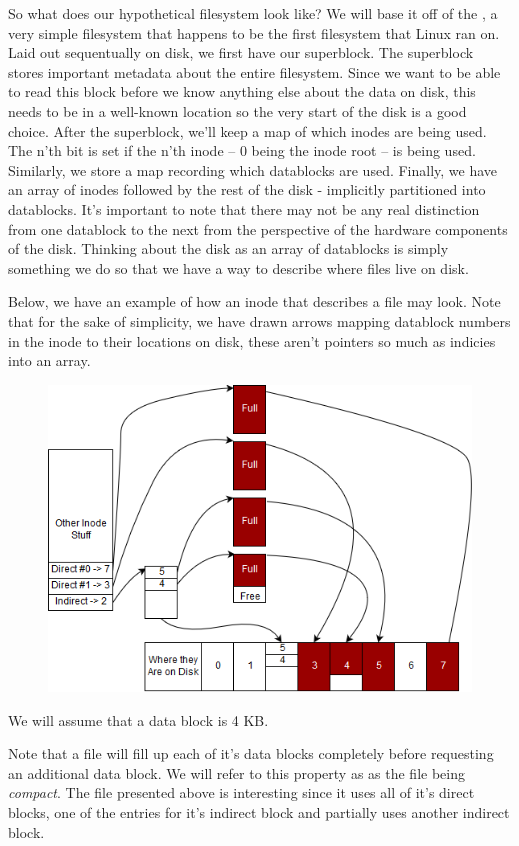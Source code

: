 So what does our hypothetical filesystem look like? We will base it off of the , a very simple filesystem
that happens to be the first filesystem that Linux ran on. Laid out sequentually on disk, we first have our superblock.
The superblock stores important metadata about the entire filesystem. Since we want to be able to read this block before
we know anything else about the data on disk, this needs to be in a well-known location so the very start of the disk is
a good choice. After the superblock, we'll keep a map of which inodes are being used. The n'th bit is set if the n'th
inode -- $0$ being the inode root -- is being used. Similarly, we store a map recording which datablocks are used.
Finally, we have an array of inodes followed by the rest of the disk - implicitly partitioned into datablocks. It's
important to note that there may not be any real distinction from one datablock to the next from the perspective of the
hardware components of the disk. Thinking about the disk as an array of datablocks is simply something we do so that we
have a way to describe where files live on disk.

Below, we have an example of how an inode that describes a file may look. Note that for the sake of simplicity, we have
drawn arrows mapping datablock numbers in the inode to their locations on disk, these aren't pointers so much as
indicies into an array.
\begin{figure}[htbp]
\centering
\includegraphics[width=.8\textwidth]{filesystems/images/sample_file.png}
\end{figure}

We will assume that a data block is 4 KB.

Note that a file will fill up each of it's data blocks completely before requesting an additional data block. We will
refer to this property as as the file being \textit{compact}. The file presented above is interesting since it uses all
of it's direct blocks, one of the entries for it's indirect block and partially uses another indirect block.

